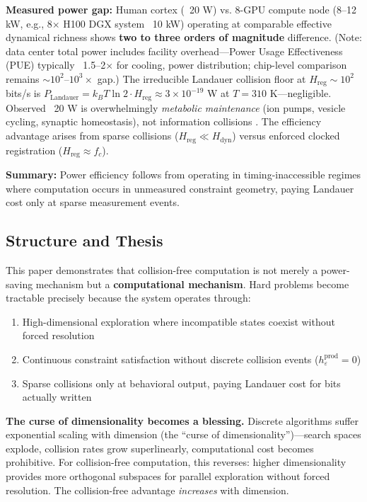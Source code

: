 \documentclass[12pt]{article}
\begin{document}
\textbf{Measured power gap:} Human cortex (~20 W) vs. 8-GPU compute node (8–12 kW, e.g., 8$\times$ H100 DGX system ~10 kW) \cite{nvidiah100} operating at comparable effective dynamical richness shows \textbf{two to three orders of magnitude} difference. (Note: data center total power includes facility overhead—Power Usage Effectiveness (PUE) typically ~1.5--2$\times$ for cooling, power distribution; chip-level comparison remains $\sim$$10^2$--$10^3\times$ gap.) The irreducible Landauer collision floor at $H_{\text{reg}} \sim 10^2$ bits/s is $P_{\text{Landauer}} = k_B T \ln 2 \cdot H_{\text{reg}} \approx 3 \times 10^{-19}$ W at $T = 310$ K---negligible. Observed ~20 W is overwhelmingly \textit{metabolic maintenance} (ion pumps, vesicle cycling, synaptic homeostasis), not information collisions \cite{attwell2001}. The efficiency advantage arises from sparse collisions ($H_{\text{reg}} \ll H_{\text{dyn}}$) versus enforced clocked registration ($H_{\text{reg}} \approx f_c$).

\textbf{Summary:} Power efficiency follows from operating in timing-inaccessible regimes where computation occurs in unmeasured constraint geometry, paying Landauer cost only at sparse measurement events.

\subsection{Structure and Thesis}

This paper demonstrates that collision-free computation is not merely a power-saving mechanism but a \textbf{computational mechanism}. Hard problems become tractable precisely because the system operates through:

\begin{enumerate}
\item High-dimensional exploration where incompatible states coexist without forced resolution
\item Continuous constraint satisfaction without discrete collision events ($h_\varepsilon^{\text{prod}} = 0$)
\item Sparse collisions only at behavioral output, paying Landauer cost for bits actually written
\end{enumerate}

\textbf{The curse of dimensionality becomes a blessing.} Discrete algorithms suffer exponential scaling with dimension (the ``curse of dimensionality'')—search spaces explode, collision rates grow superlinearly, computational cost becomes prohibitive. For collision-free computation, this reverses: higher dimensionality provides more orthogonal subspaces for parallel exploration without forced resolution. The collision-free advantage \textit{increases} with dimension.
\end{document}
